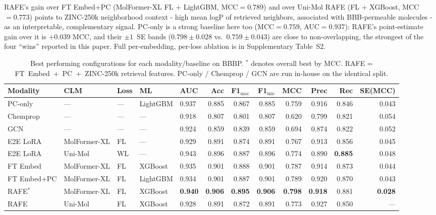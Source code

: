 \documentclass[final,1p,times]{elsarticle}
\begin{document}
RAFE's gain over FT Embed+PC (MolFormer-XL FL + LightGBM, MCC$=0.789$) and over Uni-Mol RAFE (FL + XGBoost, MCC$=0.773$) points to ZINC-250k neighborhood context - high mean logP of retrieved neighbors, associated with BBB-permeable molecules - as an interpretable, complementary signal. PC-only is a strong baseline here too (MCC$=0.759$, AUC$=0.937$): RAFE's point-estimate gain over it is $+0.039$ MCC, and their $\pm1$~SE bands ($0.798\pm0.028$ vs.\ $0.759\pm0.043$) are close to non-overlapping, the strongest of the four ``wins'' reported in this paper. Full per-embedding, per-loss ablation is in Supplementary Table~S2.

\begin{table}[!ht]
\centering
\caption{Best performing configurations for each modality/baseline on BBBP. $^*$ denotes overall best by MCC. RAFE = FT~Embed~+~PC~+~ZINC-250k retrieval features. PC-only / Chemprop / GCN are run in-house on the identical split.}
\label{tab:bbbp}
\begin{adjustbox}{max width=\textwidth}
\begin{tabular}{lllllrrrrrrr}
\toprule
Modality & CLM & Loss & ML & AUC & Acc & F1$_\text{mac}$ & F1$_\text{mic}$ & MCC & Prec & Rec & SE(MCC) \\
\midrule
PC-only    & --- & --- & LightGBM & 0.937 & 0.885 & 0.867 & 0.885 & 0.759 & 0.916 & 0.846 & 0.043 \\
Chemprop   & --- & --- & --- & 0.918 & 0.807 & 0.801 & 0.807 & 0.620 & 0.799 & 0.821 & 0.054 \\
GCN        & --- & --- & --- & 0.924 & 0.859 & 0.839 & 0.859 & 0.694 & 0.874 & 0.822 & 0.052 \\
\midrule
E2E LoRA   & MolFormer-XL & FL & --- & 0.929 & 0.891 & 0.874 & 0.891 & 0.767 & 0.913 & 0.856 & 0.045 \\
E2E LoRA   & Uni-Mol      & WL & --- & 0.943 & 0.896 & 0.887 & 0.896 & 0.774 & 0.890 & \textbf{0.885} & 0.048 \\
\midrule
FT Embed   & MolFormer-XL & FL & XGBoost & 0.935 & 0.901 & 0.888 & 0.901 & 0.787 & 0.914 & 0.873 & 0.044 \\
FT Embed+PC& MolFormer-XL & FL & LightGBM& 0.934 & 0.901 & 0.887 & 0.901 & 0.789 & 0.920 & 0.870 & 0.043 \\
\midrule
RAFE$^*$   & MolFormer-XL & FL & XGBoost & \textbf{0.940} & \textbf{0.906} & \textbf{0.895} & \textbf{0.906} & \textbf{0.798} & \textbf{0.918} & 0.881 & \textbf{0.028} \\
RAFE       & Uni-Mol      & FL & XGBoost & 0.928 & 0.891 & 0.872 & 0.891 & 0.773 & 0.927 & 0.850 & --- \\
\bottomrule
\end{tabular}
\end{adjustbox}
\end{table}
\end{document}
